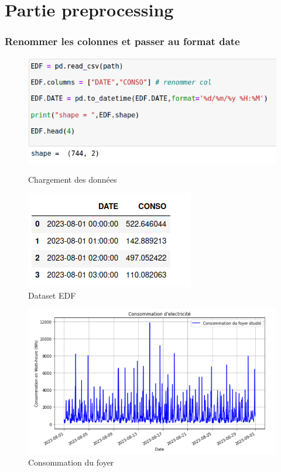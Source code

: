 \documentclass{beamer}
\theoremstyle{definition}
\begin{document}
\section{Partie preprocessing}
\begin{frame}
	\frametitle{Renommer les colonnes et passer au format date}
		\begin{minipage}[c]{1\linewidth}
		\begin{minipage}[c]{0.4\linewidth}\centering\begin{figure}
				\centering
				\includegraphics[scale=0.28]{2.png}
				\caption*{Chargement des données}
				\includegraphics[width=1\linewidth]{3.png}
				\caption*{Dataset EDF}
		\end{figure}\end{minipage}\hfill 
		\begin{minipage}[c]{0.5\linewidth}\centering\begin{figure}
				\begin{center}
					\includegraphics[width=1\linewidth]{1.png}			
					\caption*{Consommation du foyer}
				\end{center}
				

\end{figure}
\end{minipage}
\end{minipage}
\end{frame}
\end{document}
